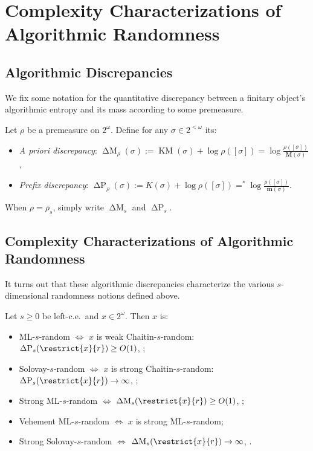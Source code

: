 \section{Complexity Characterizations of Algorithmic Randomness} \label{section:Complexity_Characterizations_of_Algorithmic_Randomness}

\subsection{Algorithmic Discrepancies}

We fix some notation for the quantitative discrepancy between a finitary object's algorithmic entropy and its mass according to some premeasure. 

\begin{definition}
    Let $\rho$ be a premeasure on $2^\omega$. Define for any $\sigma \in 2^{<\omega}$ its:
    \begin{itemize}
        \item \textit{A priori discrepancy}: $\operatorname{\Delta M}_\rho(\sigma) := \operatorname{KM}(\sigma) + \log \rho([\sigma]) = \log \frac{\rho([\sigma])}{\mathbf{M}(\sigma)}$,
        \item \textit{Prefix discrepancy}: $\operatorname{\Delta P}_\rho(\sigma) := K(\sigma) + \log \rho([\sigma]) =^* \log \frac{\rho([\sigma])}{\mathbf{m}(\sigma)}$.
    \end{itemize}
\end{definition}

When $\rho = \rho_s$, simply write $\operatorname{\Delta M}_s$ and $\operatorname{\Delta P}_s$. 

\subsection{Complexity Characterizations of Algorithmic Randomness}

It turns out that these algorithmic discrepancies characterize the various $s$-dimensional randomness notions defined above. 

\begin{theorem}
    \label{theorem:complexity_characterizations_of_randomness}
    Let $s \geq 0$ be left-c.e.~and $x \in 2^\omega$. Then $x$ is:
    \begin{itemize}
        \item ML-$s$-random $\iff$ $x$ is weak Chaitin-$s$-random: $\operatorname{\Delta P}_s(\restrict{x}{r}) \geq O(1)$, \cite{Tad02};
        \item Solovay-$s$-random $\iff$ $x$ is strong Chaitin-$s$-random: $\operatorname{\Delta P}_s(\restrict{x}{r}) \to \infty$, \cite{Tad02, CST06};
        \item Strong ML-$s$-random $\iff$ $\operatorname{\Delta M}_s(\restrict{x}{r}) \geq O(1)$, \cite{CST06};
        \item Vehement ML-$s$-random $\iff$ $x$ is strong ML-$s$-random;
        \item Strong Solovay-$s$-random $\iff$ $ \operatorname{\Delta M}_s(\restrict{x}{r}) \to \infty$, \cite{MR09}. 
    \end{itemize}
\end{theorem}


